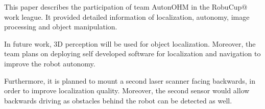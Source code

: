 
This paper describes the participation of team AutonOHM in the RobuCup$@$work league. It provided detailed information of localization, autonomy, image processing and object manipulation. 

In future work, 3D perception will be used for object localization. Moreover, the team plans on deploying self developed software for localization and navigation to improve the robot autonomy.

Furthermore, it is planned to mount a second laser scanner facing backwards, in order to improve localization quality. Moreover, the second sensor would allow backwards driving as obstacles behind the robot can be detected as well.
%
